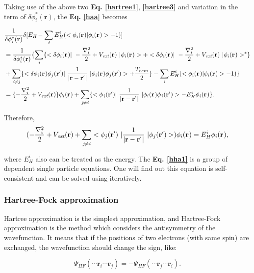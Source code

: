 \documentclass[a4paper, 12pt, titlepage,oneside,drop]{kthesis}
\begin{document}
Taking use of the above two \textbf{Eq. \ref{hartree1}}, \textbf{\ref{hartree3}} and variation in the term of  $\delta \phi^{*}_{i}(\textbf{r}{}) $, the \textbf{Eq. \ref{haa}} becomes

\begin{equation}
\begin{split}\label{hha}
& \frac{1}{\delta  \phi^{*}_{i}(\textbf{r}{})} \delta [ E_{\textit{H}} - \sumi<i> E^{i}_{H} (<\bwf<i><> | \bwf<i><> > -1)] \\
&  = \frac{1}{\delta  \phi^{*}_{i}(\textbf{r}{})} \{ \sumi<i> \{ < \delta \bwf<i><> |\ -\frac{\nabla^{2}_{i}}{2} + V_\textit{ext}(\textbf{r})  \ | \bwf<i><> > + <  \delta \bwf<i><> |\ -\frac{\nabla^{2}_{i}}{2} + V_\textit{ext}(\textbf{r})  \ |  \bwf<i><> >^{\ast} \} \\
& +  \suminj<i><j> \{  <\delta \bwf<i><> \bwfn<j><'>|\ \frac{1}{|\textbf{r} - \textbf{r}^{'} |} \ | \bwf<i><> \bwfn<j><'>> + \frac{T_{rem}}{2}\} - \sumi<i> E^{i}_{H} (<\bwf<i><> | \bwf<i><> > -1) \} \\
& =  { \{-\frac{\nabla^{2}_{i}}{2} + V_\textit{ext}(\textbf{r})} \}  \bwf<i><> +  \suminj<j><i> \{  <\bwfn<j><'>|\ \frac{1}{|\textbf{r} - \textbf{r}^{'} |} \ | \bwf<i><> \bwfn<j><'>> - E^{i}_{H}  \bwf<i><>  \}.
\end{split}
\end{equation}

Therefore,
\begin{equation}\label{hha1}
(-\frac{\nabla^{2}_{i}}{2} + V_\textit{ext}(\textbf{r})+ \suminj<j><i> <\bwfn<j><'>\ | \frac{1}{|\textbf{r} - \textbf{r}^{'} |} \ | \bwfn<j><'>>) \bwf<i><> = E^{i}_{H} \bwf<i><>,
\end{equation}

where $E^{i}_{H}$  also can be treated as the energy. The \textbf{Eq. \ref{hha1}} is a group of dependent single
 particle equations. One will find out this equation is self-consistent and can be solved using iteratively.

\subsubsection{Hartree-Fock approximation}
Hartree approximation is the simplest approximation, and Hartree-Fock approximation is the method which considers the 
antisymmetry of the wavefunction. It means that if the positions of two electrons (with same spin) are exchanged, the wavefunction should change the sign, like:

\begin{equation}\label{hfwf}
\Psi_\textit{HF} ( \cdots \textbf{r}_\textit{i} \cdots  \textbf{r}_\textit{j} ) = - \Psi_\textit{HF} ( \cdots \textbf{r}_\textit{j} \cdots  \textbf{r}_\textit{i} ).
\end{equation}
\end{document}
